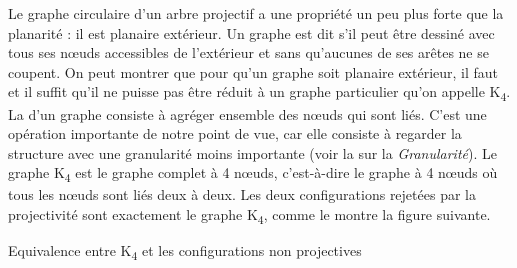 {    Le graphe circulaire d’un arbre projectif a une propriété un peu plus forte que la planarité : il est planaire extérieur.
    \ea
    Un graphe est dit  s’il peut être dessiné avec tous ses nœuds accessibles de l’extérieur et sans qu’aucunes de ses arêtes ne se coupent.
    \z
    On peut montrer que pour qu’un graphe soit planaire extérieur, il faut et il suffit qu’il ne puisse pas être réduit à un graphe particulier qu’on appelle K\textsubscript{4}. La  d’un graphe consiste à agréger ensemble des nœuds qui sont liés. C’est une opération importante de notre point de vue, car elle consiste à regarder la structure avec une granularité moins importante (voir la  sur la \textit{Granularité}). Le graphe K\textsubscript{4} est le graphe complet à 4 nœuds, c’est-à-dire le graphe à 4 nœuds où tous les nœuds sont liés deux à deux. Les deux configurations rejetées par la projectivité sont exactement le graphe K\textsubscript{4}, comme le montre la figure suivante.

    \ea
    Equivalence entre K\textsubscript{4} et les configurations non projectives\\
    \hfill
    \hfill
    \z
}

